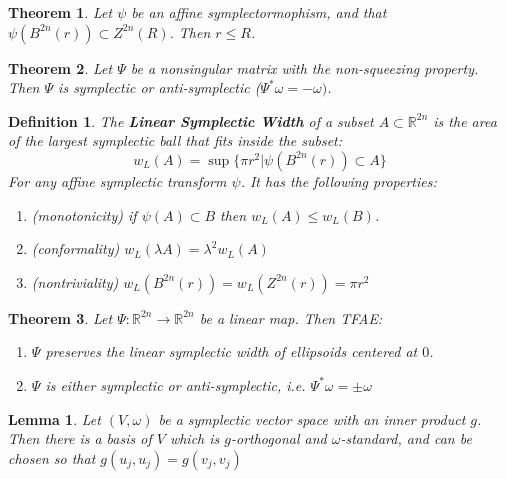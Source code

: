 \documentclass{article}
\newtheorem{thm}{Theorem}
\newtheorem{defn}{Definition}
\newtheorem{lem}{Lemma}
\begin{document}
\begin{thm}

Let $\psi$ be an affine symplectormophism, and that $\psi(B^{2n}(r)) \subset Z^{2n}(R)$. Then $r \leq R$.

\end{thm}

\begin{thm}

Let $\Psi$ be a nonsingular matrix with the non-squeezing property. Then $\Psi$ is symplectic or anti-symplectic ($\Psi^*\omega = -\omega)$. 

\end{thm}

\begin{defn}

The \textbf{Linear Symplectic Width} of a subset $A \subset \mathbb{R}^{2n}$ is the area of the largest symplectic ball that fits inside the subset: 
\[
w_L(A) = \sup \{\pi r^2 \vert \psi(B^{2n}(r)) \subset A\}
\]
For any affine symplectic transform $\psi$. It has the following properties:

\begin{enumerate}
    \item (monotonicity) if $\psi(A) \subset B$ then $w_L(A) \leq w_L(B)$.
    \item (conformality) $w_L(\lambda A) = \lambda^2 w_L(A)$
    \item (nontriviality) $w_L(B^{2n}(r)) = w_L(Z^{2n}(r)) = \pi r^2$
\end{enumerate}
\end{defn}

\begin{thm}

Let $\Psi: \mathbb{R}^{2n} \to \mathbb{R}^{2n}$ be a linear map. Then TFAE:

\begin{enumerate}
    \item $\Psi$ preserves the linear symplectic width of ellipsoids centered at $0$.
    \item $\Psi$ is either symplectic or anti-symplectic, i.e. $\Psi^* \omega = \pm \omega$
\end{enumerate}

\end{thm}

\begin{lem}

Let $(V,\omega)$ be a symplectic vector space with an inner product $g$. Then there is a basis of $V$ which is $g$-orthogonal and $\omega$-standard, and can be chosen so that $g(u_j, u_j) = g(v_j, v_j)$

\end{lem}
\end{document}
